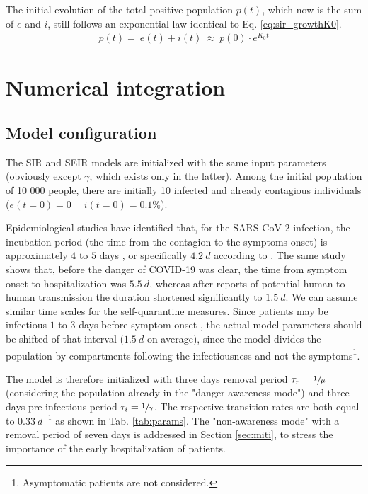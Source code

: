 \documentclass[DIV=12, BCOR=0pt]{scrartcl}  %
\begin{document}
 The initial evolution of the total positive population $p(t)$, which now is the sum of $e$ and $i$, still follows an exponential law identical to Eq. \ref{eq:sir_growthK0}.
 \begin{align}
		p(t) = \ e(t) + i(t) \ \approx \  p(0) \cdot e^{K_0 t}
 \end{align}
 
	\section{Numerical integration}
	\label{sec:numerical}
	
  \subsection{Model configuration}
	The SIR and SEIR models are initialized with the same input parameters (obviously except $\gamma$, which exists only in the latter). Among the initial population of 10 000 people, there are initially 10 infected and already contagious individuals ($e(t \! = \! 0) = 0 \; \quad i(t \! = \! 0) = 0.1 \%$).
	
	Epidemiological studies have identified that, for the SARS-CoV-2 infection, the incubation period (the time from the contagion to the symptoms onset) is approximately $4$ to $5$ days \citep{Gandhi2020}, or specifically $4.2 \ d$ according to \citet{Sanche2020}. The same study shows that, before the danger of COVID-19 was clear, the time from symptom onset to hospitalization was $5.5 \ d$, whereas after reports of potential human-to-human transmission the duration shortened significantly to $1.5 \ d$. We can assume similar time scales for the self-quarantine measures. Since patients may be infectious $1$ to $3$ days before symptom onset \citep{Gandhi2020}, the actual model parameters should be shifted of that interval ($1.5 \ d$ on average), since the model divides the population by compartments following the infectiousness and not the symptoms\footnote{Asymptomatic patients are not considered.}.
	
  The model is therefore initialized with three days removal period $\tau_r = \sfrac{1}{\mu}$ (considering the population already in the "danger awareness mode") and three days pre-infectious period $\tau_i = \sfrac{1}{\gamma}$. 
  The respective transition rates are both equal to $0.33 \ d^{-1}$ as shown in Tab. \ref{tab:params}. 
  The "non-awareness mode" with a removal period of seven days is addressed in Section \ref{sec:miti}, to stress the importance of the early hospitalization of patients. 
  
 
\end{document}
